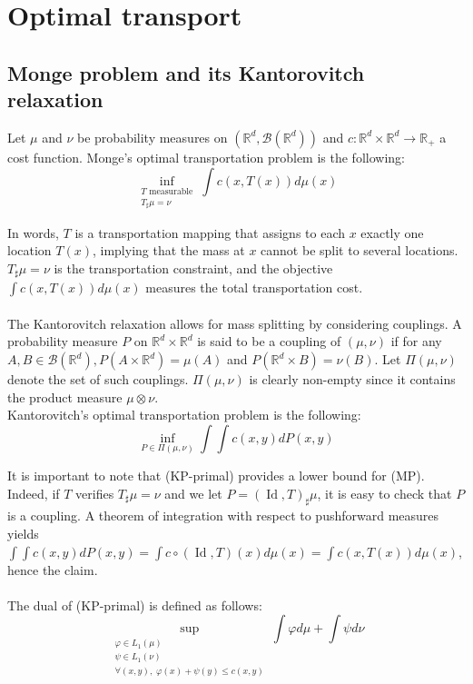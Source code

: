 \documentclass{article}
\theoremstyle{definition}
\theoremstyle{remark}
\DeclareMathOperator{\id}{Id}
\begin{document}
\section{Optimal transport}

\subsection{Monge problem and its Kantorovitch relaxation}

Let $\mu$ and $\nu$ be probability measures on $(\mathbb R^d, \mathcal B(\mathbb R^d))$ and $c:\mathbb R^d\times \mathbb R^d\to \mathbb R_+$ a cost function. Monge's optimal transportation problem is the following:
\begin{equation}\tag{MP}
\inf_{\substack{T \text{ measurable}\\ T_\sharp \mu = \nu}} \int c(x,T(x)) d\mu(x) 
\end{equation}

In words, $T$ is a transportation mapping that assigns to each $x$ exactly one location $T(x)$, implying that the mass at $x$ cannot be split to several locations. $T_\sharp \mu = \nu$ is the transportation constraint, and the objective $\int c(x,T(x)) d\mu(x) $ measures the total transportation cost.
\\ \\
The Kantorovitch relaxation allows for mass splitting by considering couplings. A probability measure $P$ on $\mathbb R^d \times \mathbb R^d$ is said to be a coupling of $(\mu,\nu)$ if for any $A,B \in \mathcal B(\mathbb R^d), P(A\times \mathbb R^d) = \mu(A)$ and $P(\mathbb R^d\times B) = \nu(B)$. Let $\Pi(\mu, \nu)$ denote the set of such couplings. $\Pi(\mu, \nu)$ is clearly non-empty since it contains the product measure $\mu \otimes \nu$.\\
Kantorovitch's optimal transportation problem is the following:
\begin{equation}\tag{KP-primal}
\inf_{P\in \Pi(\mu, \nu)} \int\int c(x,y) dP(x,y)
\end{equation}

It is important to note that (KP-primal) provides a lower bound for (MP). Indeed, if $T$ verifies $T_\sharp \mu = \nu$ and we let $P=(\id,T)_{\sharp}\mu$, it is easy to check that $P$ is a coupling. A theorem of integration with respect to pushforward measures yields $\int \int c(x,y) dP(x,y) = \int c\circ (\id,T)(x) d\mu(x) = \int c(x,T(x)) d\mu(x)$, hence the claim. %
\\ 
\\
The dual of (KP-primal) is defined as follows:
\begin{equation}\tag{KP-dual}
\sup_{\substack{\varphi \in L_1(\mu)\\ \psi \in L_1(\nu)\\ \forall (x,y), \;\varphi(x)+\psi(y)\leq c(x,y)}} \int \varphi d\mu + \int \psi d\nu
\end{equation}
\end{document}
